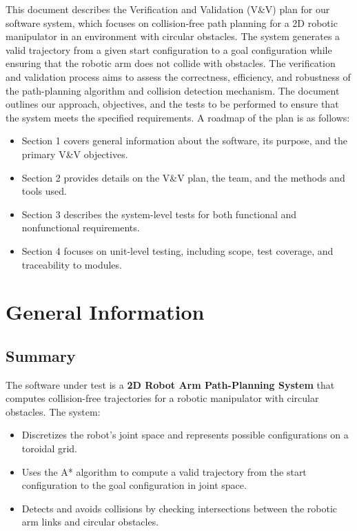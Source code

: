 \documentclass[12pt, titlepage]{article}
\begin{document}
This document describes the Verification and Validation (V\&V) plan for our software system, which focuses on collision-free path planning for a 2D robotic manipulator in an environment with circular obstacles. The system generates a valid trajectory from a given start configuration to a goal configuration while ensuring that the robotic arm does not collide with obstacles. The verification and validation process aims to assess the correctness, efficiency, and robustness of the path-planning algorithm and collision detection mechanism.
The document outlines our approach, objectives, and the tests to be performed to ensure that the system meets the specified requirements. A roadmap of the plan is as follows:
\begin{itemize}
  \item Section 1 covers general information about the software, its purpose, and the primary V\&V objectives.
  \item Section 2 provides details on the V\&V plan, the team, and the methods and tools used.
  \item Section 3 describes the system-level tests for both functional and nonfunctional requirements.
  \item Section 4 focuses on unit-level testing, including scope, test coverage, and traceability to modules.
\end{itemize}

\section{General Information}

\subsection{Summary}
The software under test is a \textbf{2D Robot Arm Path-Planning System} that computes collision-free trajectories for a robotic manipulator with circular obstacles. The system:
\begin{itemize}
    \item Discretizes the robot’s joint space and represents possible configurations on a toroidal grid.
    \item Uses the A* algorithm to compute a valid trajectory from the start configuration to the goal configuration in joint space.
    \item Detects and avoids collisions by checking intersections between the robotic arm links and circular obstacles.
\end{itemize}
\end{document}
